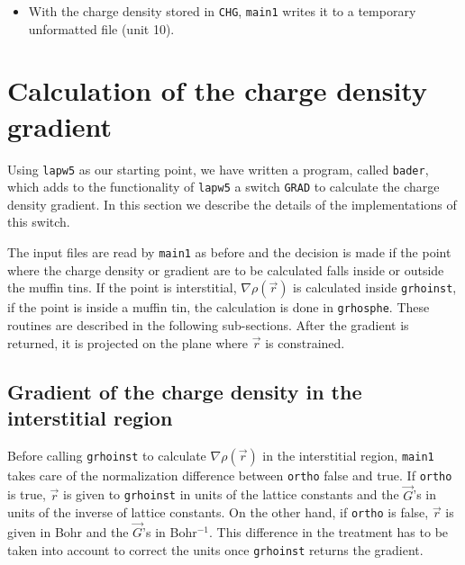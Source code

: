 \documentclass{article}
\begin{document}
\begin{itemize}
\begin{itemize}
\[\begin{array}{ll}
\displaystyle 
Y_l^m & \mbox{if}\; m=0\;,\\
~\\
\displaystyle 
{i\left((-1)^{m+1}Y_l^m+Y_l^{-m}\right)\over\sqrt{2}}& 
\mbox{if}\;\; m\neq0\; \mbox{and}\;\; l<0\;,\\
~\\
\displaystyle 
{\left((-1)^{m}Y_l^m+Y_l^{-m}\right)\over\sqrt{2}}& 
\mbox{if}\;\; m\neq0\; \mbox{and}\;\; l>0\;,
\end{array}
\right.
\]
where l and m are stored in $\mathtt{LM}(1,\mathtt{ILM},j)$ and
$\mathtt{LM}(2,\mathtt{ILM},j)$ respectively, and read from
\texttt{in2}.
\item Finally the summation of Eq.~(\ref{sumchg}) is performed talking
care if the local symmetry of the atom is cubic or not.
\end{itemize}
\item With the charge density stored in \texttt{CHG}, \texttt{main1}
writes it to a temporary unformatted file (unit 10).
\end{itemize}

\section{Calculation of the charge density gradient}

Using \texttt{lapw5} as our starting point, we have written a program,
called \texttt{bader}, which adds to the functionality of
\texttt{lapw5} a switch \texttt{GRAD} to calculate the charge density
gradient. In this section we describe the details of the
implementations of this switch.

The input files are read by \texttt{main1} as before and the decision
is made if the point where the charge density or gradient are to be
calculated falls inside or outside the muffin tins. If the point is
interstitial, $\nabla\rho(\vec{r})$ is calculated inside
\texttt{grhoinst}, if the point is inside a muffin tin, the
calculation is done in \texttt{grhosphe}. These routines are described
in the following sub-sections. After the gradient is returned, it is
projected on the plane where $\vec{r}$ is constrained.

\subsection{Gradient of the charge density in the interstitial region}

Before calling \texttt{grhoinst} to calculate $\nabla\rho(\vec{r})$ in
the interstitial region, \texttt{main1} takes care of the
normalization difference between \texttt{ortho} false and true. If 
\texttt{ortho} is true, $\vec{r}$ is given to  \texttt{grhoinst} in
units of the lattice constants and the $\vec{G}$'s in units of the
inverse of lattice constants. On the other hand, if \texttt{ortho} is
false, $\vec{r}$ is given in Bohr and the $\vec{G}$'s in
Bohr$^{-1}$. This difference in the treatment has to be taken into
account to correct the units once \texttt{grhoinst} returns the gradient.
\end{document}
